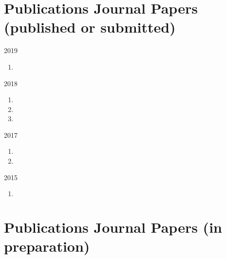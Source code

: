 
\section*{Publications {\small Journal Papers (published or submitted)}}

\begin{paracol}{2}
  \textsc{2019}
\switchcolumn
  \begin{enumerate}
    \item {}
    \setcounter{pubcounter}{\theenumi}
  \end{enumerate}
\end{paracol}

\begin{paracol}{2}
  \textsc{2018}
\switchcolumn
  \begin{enumerate}
    \setcounter{enumi}{\thepubcounter}
    \item {}
    \item {}
    \item {}
    \setcounter{pubcounter}{\theenumi}
  \end{enumerate}
\end{paracol}

\begin{paracol}{2}
  \textsc{2017}
\switchcolumn
  \begin{enumerate}
    \setcounter{enumi}{\thepubcounter}
    \item {}
    \item {}
    \setcounter{pubcounter}{\theenumi}
  \end{enumerate}
\end{paracol}

\begin{paracol}{2}
  \textsc{2015}
\switchcolumn
  \begin{enumerate}
    \setcounter{enumi}{\thepubcounter}
    \item {}
    \setcounter{pubcounter}{\theenumi}
  \end{enumerate}
\end{paracol}

\section*{Publications {\small Journal Papers (in preparation)}}

